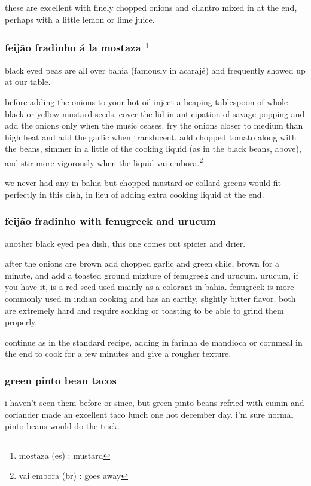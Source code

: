 these are excellent with finely chopped onions and cilantro mixed in
at the end, perhaps with a little lemon or lime juice.

\subsubsection{feij\~{a}o fradinho \'{a} la mostaza
\footnote{mostaza (es) : mustard}}

black eyed peas are all over bahia (famously in acaraj\'{e}) and
frequently showed up at our table.

before adding the onions to your hot oil inject a heaping tablespoon
of whole black or yellow mustard seeds. cover the lid in anticipation
of savage popping and add the onions only when the music ceases. fry
the onions closer to medium than high heat and add the garlic when
translucent. add chopped tomato along with the beans, simmer in a
little of the cooking liquid (as in the black beans, above), and stir
more vigorously when the liquid vai embora.\footnote{vai embora (br) :
goes away}

we never had any in bahia but chopped mustard or collard greens would
fit perfectly in this dish, in lieu of adding extra cooking liquid at
the end.

\subsubsection{feij\~{a}o fradinho with fenugreek and urucum}

another black eyed pea dish, this one comes out spicier and drier.

after the onions are brown add chopped garlic and green chile, brown
for a minute, and add a toasted ground mixture of fenugreek and
urucum. urucum, if you have it, is a red seed used mainly as a
colorant in bahia. fenugreek is more commonly used in indian cooking
and has an earthy, slightly bitter flavor. both are extremely hard and
require soaking or toasting to be able to grind them properly.

continue as in the standard recipe, adding in farinha de mandioca or
cornmeal in the end to cook for a few minutes and give a rougher
texture.

\subsubsection{green pinto bean tacos}

i haven't seen them before or since, but green pinto beans refried
with cumin and coriander made an excellent taco lunch one hot december
day. i'm sure normal pinto beans would do the trick.

